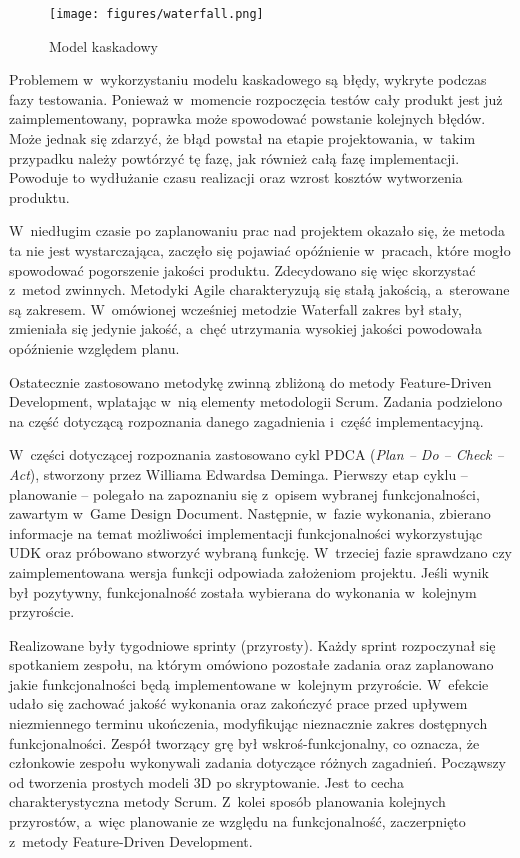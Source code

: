 \begin{figure}
\begin{center}
\texttt{[image: figures/waterfall.png]}
\caption{Model kaskadowy}
\label{waterfall}
\end{center}
\end{figure}

Problemem w~wykorzystaniu modelu kaskadowego są błędy, wykryte podczas fazy testowania. Ponieważ w~momencie rozpoczęcia testów cały produkt jest już zaimplementowany, poprawka może spowodować powstanie kolejnych błędów. Może jednak się zdarzyć, że błąd powstał na etapie projektowania, w~takim przypadku należy powtórzyć tę fazę, jak również całą fazę implementacji. Powoduje to wydłużanie czasu realizacji oraz wzrost kosztów wytworzenia produktu.

W~niedługim czasie po zaplanowaniu prac nad projektem okazało się, że metoda ta nie jest wystarczająca, zaczęło się pojawiać opóźnienie w~pracach, które mogło spowodować pogorszenie jakości produktu. Zdecydowano się więc skorzystać z~metod zwinnych. Metodyki Agile charakteryzują się stałą jakością, a~sterowane są zakresem. W~omówionej wcześniej metodzie Waterfall zakres był stały, zmieniała się jedynie jakość, a~chęć utrzymania wysokiej jakości powodowała opóźnienie względem planu. 

Ostatecznie zastosowano metodykę zwinną zbliżoną do metody Feature-Driven Development, wplatając w~nią elementy metodologii Scrum. Zadania podzielono na część dotyczącą rozpoznania danego zagadnienia i~część implementacyjną. 

W~części dotyczącej rozpoznania zastosowano cykl PDCA (\emph{Plan -- Do -- Check -- Act}), stworzony przez Williama Edwardsa Deminga. Pierwszy etap cyklu -- planowanie -- polegało na zapoznaniu się z~opisem wybranej funkcjonalności, zawartym w~Game Design Document. Następnie, w~fazie wykonania, zbierano informacje na temat możliwości implementacji funkcjonalności wykorzystując UDK oraz próbowano stworzyć wybraną funkcję. W~trzeciej fazie sprawdzano czy zaimplementowana wersja funkcji odpowiada założeniom projektu. Jeśli wynik był pozytywny, funkcjonalność została wybierana do wykonania w~kolejnym przyroście.

Realizowane były tygodniowe sprinty (przyrosty). Każdy sprint rozpoczynał się spotkaniem zespołu, na którym omówiono pozostałe zadania oraz zaplanowano jakie funkcjonalności będą implementowane w~kolejnym przyroście. W~efekcie udało się zachować jakość wykonania oraz zakończyć prace przed upływem niezmiennego terminu ukończenia, modyfikując nieznacznie zakres dostępnych funkcjonalności. Zespół tworzący grę był wskroś-funkcjonalny, co oznacza, że członkowie zespołu wykonywali zadania dotyczące różnych zagadnień. Począwszy od tworzenia prostych modeli 3D po skryptowanie. Jest to cecha charakterystyczna metody Scrum. Z~kolei sposób planowania kolejnych przyrostów, a~więc planowanie ze względu na funkcjonalność, zaczerpnięto z~metody Feature-Driven Development. 

